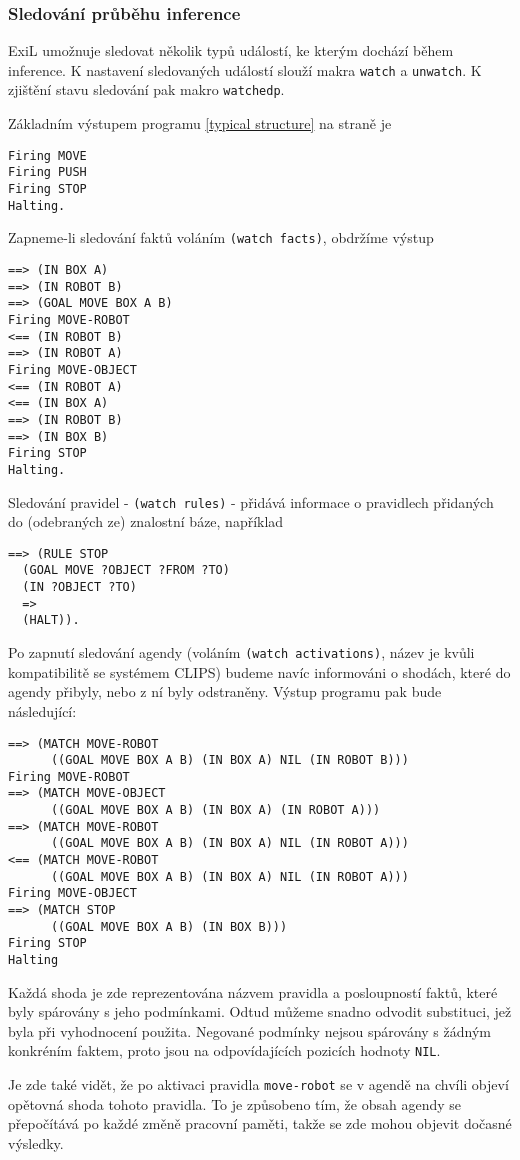 \subsubsection{Sledování průběhu inference}
\label{inference tracing}
ExiL umožnuje sledovat několik typů událostí, ke kterým dochází během inference.
K nastavení sledovaných událostí slouží makra \verb|watch| a \verb|unwatch|. K
zjištění stavu sledování pak makro \verb|watchedp|.

Základním výstupem programu \ref{typical structure} na straně \pageref{typical
structure} je
\begin{verbatim}
Firing MOVE
Firing PUSH
Firing STOP
Halting.
\end{verbatim}
Zapneme-li sledování faktů voláním \verb|(watch facts)|, obdržíme výstup
\begin{verbatim}
==> (IN BOX A)
==> (IN ROBOT B)
==> (GOAL MOVE BOX A B)
Firing MOVE-ROBOT
<== (IN ROBOT B)
==> (IN ROBOT A)
Firing MOVE-OBJECT
<== (IN ROBOT A)
<== (IN BOX A)
==> (IN ROBOT B)
==> (IN BOX B)
Firing STOP
Halting.
\end{verbatim}

Sledování pravidel - \verb|(watch rules)| - přidává informace o pravidlech
přidaných do (odebraných ze) znalostní báze, například
\begin{verbatim}
==> (RULE STOP
  (GOAL MOVE ?OBJECT ?FROM ?TO)
  (IN ?OBJECT ?TO)
  =>
  (HALT)).
\end{verbatim}

Po zapnutí sledování agendy (voláním \verb|(watch activations)|, název je kvůli
kompatibilitě se systémem CLIPS) budeme navíc informováni o shodách, které do
agendy přibyly, nebo z ní byly odstraněny. Výstup programu pak bude následující:
\begin{verbatim}
==> (MATCH MOVE-ROBOT
      ((GOAL MOVE BOX A B) (IN BOX A) NIL (IN ROBOT B)))
Firing MOVE-ROBOT
==> (MATCH MOVE-OBJECT
      ((GOAL MOVE BOX A B) (IN BOX A) (IN ROBOT A)))
==> (MATCH MOVE-ROBOT
      ((GOAL MOVE BOX A B) (IN BOX A) NIL (IN ROBOT A)))
<== (MATCH MOVE-ROBOT
      ((GOAL MOVE BOX A B) (IN BOX A) NIL (IN ROBOT A)))
Firing MOVE-OBJECT
==> (MATCH STOP
      ((GOAL MOVE BOX A B) (IN BOX B)))
Firing STOP
Halting
\end{verbatim}
Každá shoda je zde reprezentována názvem pravidla a posloupností faktů, které
byly spárovány s jeho podmínkami. Odtud můžeme snadno odvodit substituci, jež
byla při vyhodnocení použita. Negované podmínky nejsou spárovány s žádným
konkréním faktem, proto jsou na odpovídajících pozicích hodnoty \verb|NIL|.

Je zde také vidět, že po aktivaci pravidla \verb|move-robot| se v agendě na
chvíli objeví opětovná shoda tohoto pravidla. To je způsobeno tím, že obsah
agendy se přepočítává po každé změně pracovní paměti, takže se zde mohou objevit
dočasné výsledky.
